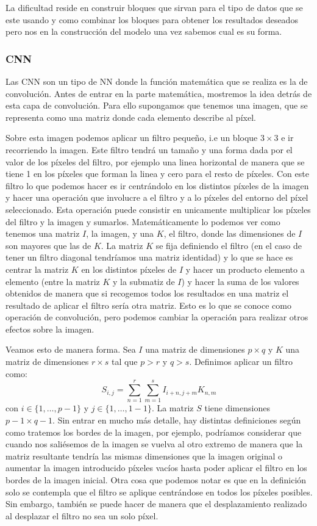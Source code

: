 \documentclass[a4paper,12pt,twoside,titlepage]{article}
\begin{document}
La dificultad reside en construir bloques que sirvan para el tipo de datos que se este usando y como combinar los bloques para obtener los resultados deseados pero nos en la construcción del modelo una vez sabemos cual es su forma.

\subsubsection*{CNN}

Las CNN son un tipo de NN donde la función matemática que se realiza es la de convolución. Antes de entrar en la parte matemática, mostremos la idea detrás de esta capa de convolución. Para ello supongamos que tenemos una imagen, que se representa como una matriz donde cada elemento describe al píxel.

Sobre esta imagen podemos aplicar un filtro pequeño, i.e un bloque $3\times 3$ e ir recorriendo la imagen. Este filtro tendrá un tamaño y una forma dada por el valor de los píxeles del filtro, por ejemplo una linea horizontal de manera que se tiene 1 en los píxeles que forman la linea y cero para el resto de píxeles. Con este filtro lo que podemos hacer es ir centrándolo en los distintos píxeles de la imagen y hacer una operación que involucre a el filtro y a lo píxeles del entorno del píxel seleccionado. Esta operación puede consistir en unicamente multiplicar los píxeles del filtro y la imagen y sumarlos. Matemáticamente lo podemos ver como tenemos una matriz $I$, la imagen, y una $K$, el filtro, donde las dimensiones de $I$ son mayores que las de $K$. La matriz $K$ se fija definiendo el filtro (en el caso de tener un filtro diagonal tendríamos una matriz identidad) y lo que se hace es centrar la matriz $K$ en los distintos píxeles de $I$ y hacer un producto elemento a elemento (entre la matriz $K$ y la submatiz de $I$) y hacer la suma de los valores obtenidos de manera que si recogemos todos los resultados en una matriz el resultado de aplicar el filtro sería otra matriz. Esto es lo que se conoce como operación de convolución, pero podemos cambiar la operación para realizar otros efectos sobre la imagen.

Veamos esto de manera forma. Sea $I$ una matriz de dimensiones $p\times q$ y $K$ una matriz de dimensiones $r\times s$ tal que $p>r$ y $q>s$. Definimos aplicar un filtro como:
\begin{equation}
  \label{ec:def_filtro}
  S_{i, j} = \sum_{n=1}^{r}\sum_{m=1}^{s}I_{i + n, j + m}K_{n,m}
\end{equation}
con $i\in\{1,\dots, p -1 \}$ y $j\in\{1,\dots, 1 -1\}$. La matriz $S$ tiene dimensiones $p-1\times q-1$. Sin entrar en mucho más detalle, hay distintas definiciones según como tratemos los bordes de la imagen, por ejemplo, podríamos considerar que cuando nos saliésemos de la imagen se vuelva al otro extremo de manera que la matriz resultante tendría las mismas dimensiones que la imagen original o aumentar la imagen introducido píxeles vacíos hasta poder aplicar el filtro en los bordes de la imagen inicial. Otra cosa que podemos notar es que en la definición solo se contempla que el filtro se aplique centrándose en todos los píxeles posibles. Sin embargo, también se puede hacer de manera que el desplazamiento realizado al desplazar el filtro no sea un solo píxel.
\end{document}
